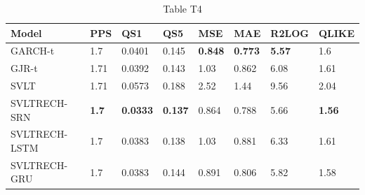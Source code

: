 \begin{table}[htbp]
\centering
\caption{Table T4}
\label{tab:T4}
\begin{tabular}{llllllll}
\toprule
Model & PPS & QS1 & QS5 & MSE & MAE & R2LOG & QLIKE \\
\midrule
GARCH-t & 1.7 & 0.0401 & 0.145 & \textbf{0.848} & \textbf{0.773} & \textbf{5.57} & 1.6 \\
GJR-t & 1.71 & 0.0392 & 0.143 & 1.03 & 0.862 & 6.08 & 1.61 \\
SVLT & 1.71 & 0.0573 & 0.188 & 2.52 & 1.44 & 9.56 & 2.04 \\
SVLTRECH-SRN & \textbf{1.7} & \textbf{0.0333} & \textbf{0.137} & 0.864 & 0.788 & 5.66 & \textbf{1.56} \\
SVLTRECH-LSTM & 1.7 & 0.0383 & 0.138 & 1.03 & 0.881 & 6.33 & 1.61 \\
SVLTRECH-GRU & 1.7 & 0.0383 & 0.144 & 0.891 & 0.806 & 5.82 & 1.58 \\
\bottomrule
\end{tabular}
\end{table}